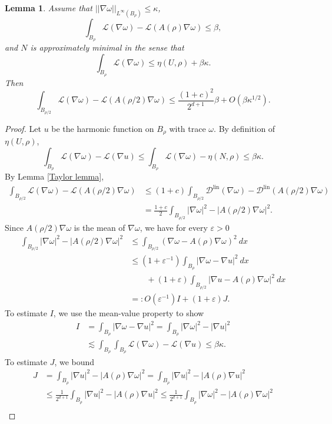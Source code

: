 \documentclass[reqno,12pt,letterpaper]{amsart}
\newcommand{\Lagrange}{\mathscr L}
\newcommand{\DirL}{\mathscr D^{\mathrm{lin}}}
\newtheorem{lemma}[theorem]{Lemma}
\theoremstyle{definition}
\numberwithin{equation}{section}
\begin{document}
\begin{lemma}
Assume that $||\nabla \omega||_{L^\infty(B_\rho)} \leq \kappa$,
$$\int_{B_\rho} \Lagrange(\nabla \omega) - \Lagrange(A(\rho)\nabla \omega) \leq \beta,$$
and $N$ is approximately minimal in the sense that
$$\int_{B_\rho} \Lagrange(\nabla \omega) \leq \eta(U, \rho) + \beta \kappa.$$
Then
$$\int_{B_{\rho/2}} \Lagrange(\nabla \omega) - \Lagrange(A(\rho/2)\nabla \omega) \leq \frac{(1 + c)^2}{2^{d + 1}}\beta + O(\beta \kappa^{1/2}).$$
\end{lemma}
\begin{proof}
Let $u$ be the harmonic function on $B_\rho$ with trace $\omega$.
By definition of $\eta(U, \rho)$,
$$\int_{B_\rho} \Lagrange(\nabla \omega) - \Lagrange(\nabla u) \leq \int_{B_\rho} \Lagrange(\nabla \omega) - \eta(N, \rho) \leq \beta\kappa.$$
By Lemma \ref{Taylor lemma},
\begin{align*}
\int_{B_{\rho/2}} \Lagrange(\nabla \omega) - \Lagrange(A(\rho/2)\nabla \omega) &\leq (1 + c)\int_{B_{\rho/2}} \DirL(\nabla \omega) - \DirL(A(\rho/2)\nabla \omega) \\
&= \frac{1 + c}{2} \int_{B_{\rho/2}} |\nabla \omega|^2 - |A(\rho/2)\nabla\omega|^2.
\end{align*}
Since $A(\rho/2)\nabla \omega$ is the mean of $\nabla \omega$, we have for every $\varepsilon > 0$
\begin{align*}
\int_{B_{\rho/2}} |\nabla \omega|^2 - |A(\rho/2)\nabla \omega|^2 &\leq \int_{B_{\rho/2}} (\nabla \omega - A(\rho)\nabla \omega)^2 ~dx \\
&\leq (1 + \varepsilon^{-1})\int_{B_\rho} |\nabla \omega - \nabla u|^2 ~dx\\
&\qquad + (1 + \varepsilon) \int_{B_{\rho/2}} |\nabla u - A(\rho)\nabla \omega|^2 ~dx\\
&=: O(\varepsilon^{-1})I + (1 + \varepsilon)J.
\end{align*}
To estimate $I$, we use the mean-value property to show
\begin{align*}
I &= \int_{B_\rho} |\nabla \omega - \nabla u|^2 = \int_{B_\rho} |\nabla \omega|^2 - |\nabla u|^2 \\
&\lesssim \int_{B_\rho} \int_{B_\rho} \Lagrange(\nabla \omega) - \Lagrange(\nabla u) \leq \beta \kappa.
\end{align*}
To estimate $J$, we bound
\begin{align*}
J &= \int_{B_\rho} |\nabla u|^2 - |A(\rho)\nabla \omega|^2 = \int_{B_\rho} |\nabla u|^2 - |A(\rho)\nabla u|^2 \\
&\leq \frac{1}{2^{d + 1}} \int_{B_\rho} |\nabla u|^2 - |A(\rho)\nabla u|^2 \leq \frac{1}{2^{d + 1}} \int_{B_\rho} |\nabla \omega|^2 - |A(\rho)\nabla \omega|^2 \\

\end{align*}
\end{proof}
\end{document}
